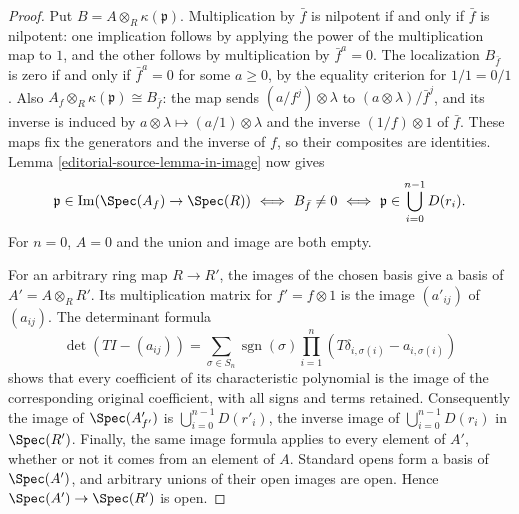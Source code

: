 \begin{proof}
\medskip\noindent
Put $B=A\otimes_R\kappa(\mathfrak p)$. Multiplication by $\bar f$
is nilpotent if and only if $\bar f$ is nilpotent: one implication
follows by applying the power of the multiplication map to $1$, and
the other follows by multiplication by $\bar f^a=0$.
The localization $B_{\bar f}$ is zero if and only if
$\bar f^a=0$ for some $a\geq0$, by the equality criterion for
$1/1=0/1$. Also
$A_f\otimes_R\kappa(\mathfrak p)\cong B_{\bar f}$:
the map sends $(a/f^j)\otimes\lambda$ to
$(a\otimes\lambda)/\bar f^j$, and its inverse is induced by
$a\otimes\lambda\mapsto(a/1)\otimes\lambda$ and the inverse
$(1/f)\otimes1$ of $\bar f$. These maps fix the generators and
the inverse of $f$, so their composites are identities.
Lemma \ref{editorial-source-lemma-in-image} now gives
$$
\mathfrak p\in\operatorname{Im}(\Spec(A_f)\to\Spec(R))
\ \Longleftrightarrow\ B_{\bar f}\ne0
\ \Longleftrightarrow\ \mathfrak p\in\bigcup_{i=0}^{n-1}D(r_i).
$$
For $n=0$, $A=0$ and the union and image are both empty.

\medskip\noindent
For an arbitrary ring map $R\to R'$, the images of the chosen basis
give a basis of $A'=A\otimes_RR'$. Its multiplication matrix for
$f'=f\otimes1$ is the image $(a'_{ij})$ of $(a_{ij})$. The determinant
formula
$$
\det(TI-(a_{ij}))=
\sum_{\sigma\in S_n}\operatorname{sgn}(\sigma)
\prod_{i=1}^n(T\delta_{i,\sigma(i)}-a_{i,\sigma(i)})
$$
shows that every coefficient of its characteristic polynomial is the
image of the corresponding original coefficient, with all signs and
terms retained. Consequently the image of $\Spec(A'_{f'})$ is
$\bigcup_{i=0}^{n-1}D(r'_i)$, the inverse image of
$\bigcup_{i=0}^{n-1}D(r_i)$ in $\Spec(R')$.
Finally, the same image formula applies to every element of $A'$,
whether or not it comes from an element of $A$. Standard opens form
a basis of $\Spec(A')$, and arbitrary unions of their open images
are open. Hence $\Spec(A')\to\Spec(R')$ is open.
\end{proof}